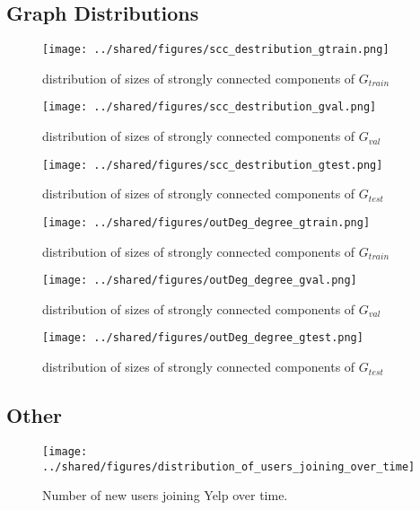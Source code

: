 \documentclass[letterpaper, 10 pt, conference]{ieeeconf}  %
\begin{document}
\subsection{Graph Distributions}
\label{sec:graph_distributions}
\begin{figure}[h!]
\centering
\texttt{[image: ../shared/figures/scc\_destribution\_gtrain.png]}
\caption{distribution of sizes of strongly connected components of $G_{train}$}
\label{fig:distribution_scc_g_train}
\end{figure}
\begin{figure}[h!]
\centering
\texttt{[image: ../shared/figures/scc\_destribution\_gval.png]}
\caption{distribution of sizes of strongly connected components of $G_{val}$}
\label{fig:distribution_scc_g_val}
\end{figure}
\begin{figure}[h!]
\centering
\texttt{[image: ../shared/figures/scc\_destribution\_gtest.png]}
\caption{distribution of sizes of strongly connected components of $G_{test}$}
\label{fig:distribution_scc_g_test}
\end{figure}

\begin{figure}[h!]
\centering
\texttt{[image: ../shared/figures/outDeg\_degree\_gtrain.png]}
\caption{distribution of sizes of strongly connected components of $G_{train}$}
\label{fig:degree_distribution_g_train}
\end{figure}
\begin{figure}[h!]
\centering
\texttt{[image: ../shared/figures/outDeg\_degree\_gval.png]}
\caption{distribution of sizes of strongly connected components of $G_{val}$}
\label{fig:degree_distribution_g_val}
\end{figure}
\begin{figure}[h!]
\centering
\texttt{[image: ../shared/figures/outDeg\_degree\_gtest.png]}
\caption{distribution of sizes of strongly connected components of $G_{test}$}
\label{fig:degree_distribution_g_test}
\end{figure}


\subsection{Other}


\begin{figure}[h!]
\centering
\texttt{[image: ../shared/figures/distribution\_of\_users\_joining\_over\_time]}
\caption{Number of new users joining Yelp over time.}
\label{fig:users_join_over_time}
\end{figure}
\end{document}
